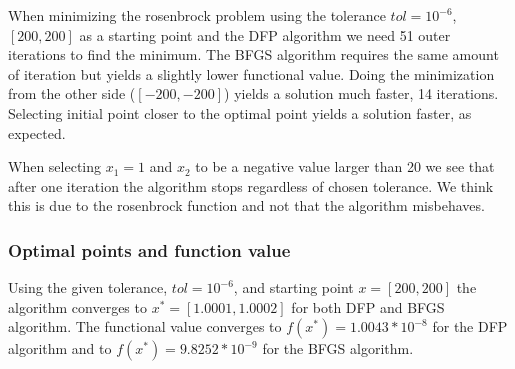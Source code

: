 When minimizing the rosenbrock problem using the tolerance $tol=10^{-6}$, $[200,200]$ as a starting point and the DFP algorithm we need 51 outer iterations to find the minimum. The BFGS algorithm requires the same amount of iteration but yields a slightly lower functional value. Doing the minimization from the other side ($[-200,-200]$) yields a solution much faster, 14 iterations. Selecting initial point closer to the optimal point yields a solution faster, as expected. 

When selecting $x_1=1$ and $x_2$ to be a negative value larger than 20 we see that after one iteration the algorithm stops regardless of chosen tolerance. We think this is due to the rosenbrock function and not that the algorithm misbehaves.

\subsubsection{Optimal points and function value}
Using the given tolerance, $tol = 10^{-6}$, and starting point $x = [200,200]$ the algorithm converges to $x^*=[1.0001,1.0002]$ for both DFP and BFGS algorithm. The functional value converges to $f(x^*)=1.0043*10^{-8}$ for the DFP algorithm and to $f(x^*)=9.8252*10^{-9}$ for the BFGS algorithm. 